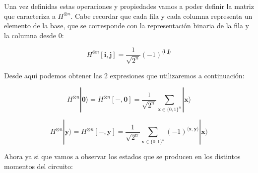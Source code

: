  Una vez definidas estas operaciones y propiedades vamos a poder definir la matriz que caracteriza a $H^{\otimes n}$. Cabe recordar que cada fila y cada columna representa un elemento de la base, que se corresponde con la representación binaria de la fila y la columna desde 0:
 
 \begin{equation}H^{\otimes n} [\mathbf{i},\mathbf{j}] = \dfrac{1}{\sqrt{2^{n}}}(-1)^{\langle\mathbf{i},\mathbf{j}\rangle}\end{equation}

 Desde aquí podemos obtener las 2 expresiones que utilizaremos a continuación:

 \begin{equation}
     H^{\otimes n}|\mathbf{0}\rangle=H^{\otimes n}[-,\mathbf{0}]=\dfrac{1}{\sqrt{2^{n}}}\sum_{\mathbf{x} \in \{0,1\}^{n}} |\mathbf{x}\rangle
 \end{equation}

 \begin{equation}
     H^{\otimes n}|\mathbf{y}\rangle=H^{\otimes n}[-,\mathbf{y}]=\dfrac{1}{\sqrt{2^{n}}}\sum_{\mathbf{x} \in \{0,1\}^{n}} (-1)^{\langle\mathbf{x},\mathbf{y}\rangle}|\mathbf{x}\rangle
 \end{equation}
 
 Ahora ya si que vamos a observar los estados que se producen en los distintos momentos del circuito:

